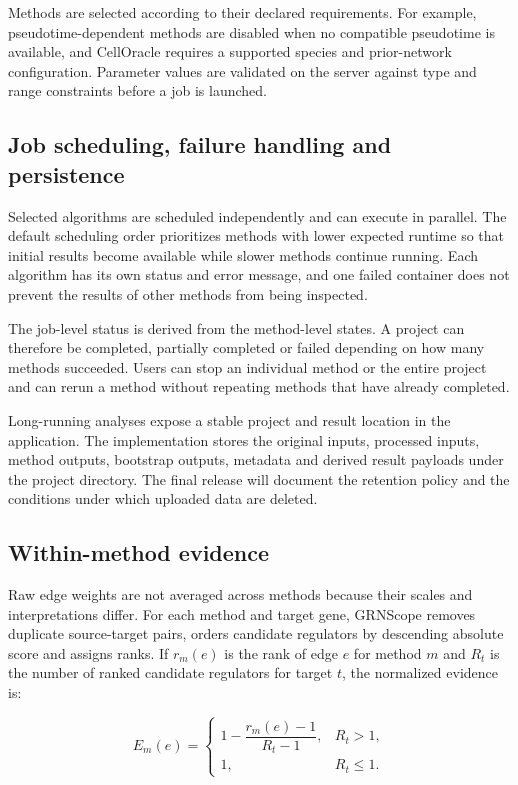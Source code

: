 \documentclass[unnumsec,webpdf,modern,large]{oup-authoring-template}%
\begin{document}
Methods are selected according to their declared requirements. For example, pseudotime-dependent methods are disabled when no compatible pseudotime is available, and CellOracle requires a supported species and prior-network configuration. Parameter values are validated on the server against type and range constraints before a job is launched.

\subsection{Job scheduling, failure handling and persistence}

Selected algorithms are scheduled independently and can execute in parallel. The default scheduling order prioritizes methods with lower expected runtime so that initial results become available while slower methods continue running. Each algorithm has its own status and error message, and one failed container does not prevent the results of other methods from being inspected.

The job-level status is derived from the method-level states. A project can therefore be completed, partially completed or failed depending on how many methods succeeded. Users can stop an individual method or the entire project and can rerun a method without repeating methods that have already completed.

Long-running analyses expose a stable project and result location in the application. The implementation stores the original inputs, processed inputs, method outputs, bootstrap outputs, metadata and derived result payloads under the project directory. The final release will document the retention policy and the conditions under which uploaded data are deleted.

\subsection{Within-method evidence}

Raw edge weights are not averaged across methods because their scales and interpretations differ. For each method and target gene, GRNScope removes duplicate source-target pairs, orders candidate regulators by descending absolute score and assigns ranks. If $r_m(e)$ is the rank of edge $e$ for method $m$ and $R_t$ is the number of ranked candidate regulators for target $t$, the normalized evidence is:

\begin{equation}
E_m(e)=
\begin{cases}
1-\dfrac{r_m(e)-1}{R_t-1}, & R_t>1,\\[1.5ex]
1, & R_t\leq 1.
\end{cases}
\end{equation}
\end{document}
